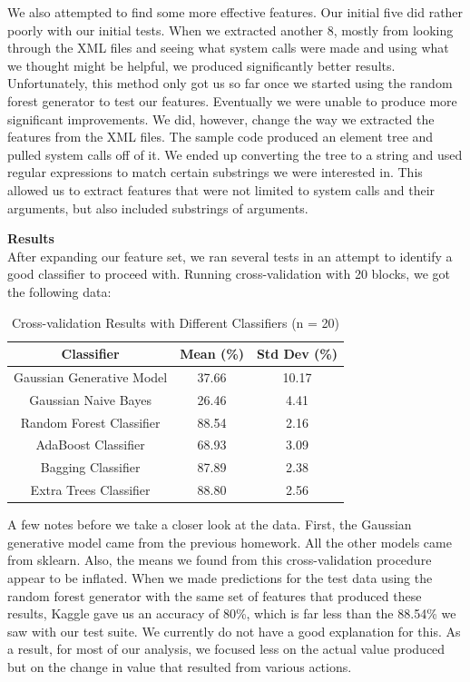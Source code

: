 \documentclass[12pt]{article}
\begin{document}
We also attempted to find some more effective features. Our initial five did rather poorly with our initial tests. When we extracted another 8, mostly from looking through the XML files and seeing what system calls were made and using what we thought might be helpful, we produced significantly better results. Unfortunately, this method only got us so far once we started using the random forest generator to test our features. Eventually we were unable to produce more significant improvements. We did, however, change the way we extracted the features from the XML files. The sample code produced an element tree and pulled system calls off of it. We ended up converting the tree to a string and used regular expressions to match certain substrings we were interested in. This allowed us to extract features that were not limited to system calls and their arguments, but also included substrings of arguments. 

\bigskip

\textbf{Results} \\
After expanding our feature set, we ran several tests in an attempt to identify a good classifier to proceed with. Running cross-validation with 20 blocks, we got the following data:

\begin{table}[h!]
\centering
\begin{tabular} {c | c | c}
Classifier & Mean (\%) & Std Dev (\%) \\ \hline
Gaussian Generative Model & 37.66 & 10.17 \\
Gaussian Naive Bayes & 26.46 & 4.41 \\
Random Forest Classifier & \cellcolor{green}88.54 & \cellcolor{green}2.16 \\
AdaBoost Classifier & 68.93 & 3.09 \\
Bagging Classifier & 87.89& 2.38 \\
Extra Trees Classifier & \cellcolor{green}88.80 & 2.56 \\
\end{tabular}
\caption{Cross-validation Results with Different Classifiers (n = 20)}
\label{table:1}
\end{table}

A few notes before we take a closer look at the data. First, the Gaussian generative model came from the previous homework. All the other models came from sklearn. Also, the means we found from this cross-validation procedure appear to be inflated. When we made predictions for the test data using the random forest generator with the same set of features that produced these results, Kaggle gave us an accuracy of 80\%, which is far less than the 88.54\% we saw with our test suite. We currently do not have a good explanation for this. As a result, for most of our analysis, we focused less on the actual value produced but on the change in value that resulted from various actions. \\
\end{document}
